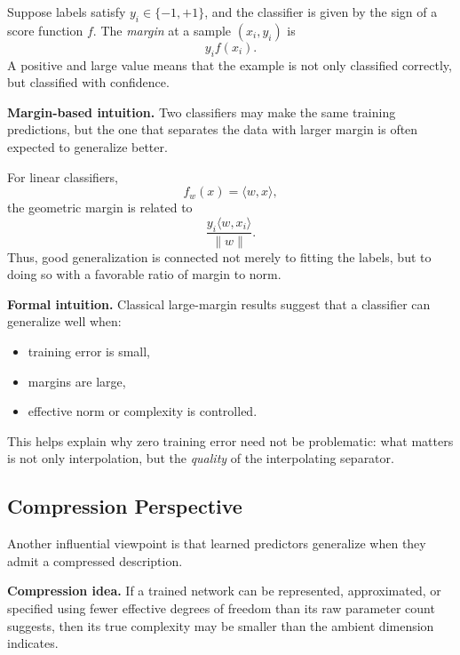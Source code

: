 Suppose labels satisfy \(y_i \in \{-1,+1\}\), and the classifier is given by the sign of a score function \(f\). The \emph{margin} at a sample \((x_i,y_i)\) is
\[
y_i f(x_i).
\]
A positive and large value means that the example is not only classified correctly, but classified with confidence.

\medskip

\noindent
\textbf{Margin-based intuition.}
Two classifiers may make the same training predictions, but the one that separates the data with larger margin is often expected to generalize better.

\medskip

\noindent
For linear classifiers,
\[
f_w(x)=\langle w,x\rangle,
\]
the geometric margin is related to
\[
\frac{y_i \langle w,x_i\rangle}{\|w\|}.
\]
Thus, good generalization is connected not merely to fitting the labels, but to doing so with a favorable ratio of margin to norm.

\medskip

\noindent
\textbf{Formal intuition.}
Classical large-margin results suggest that a classifier can generalize well when:
\begin{itemize}
    \item training error is small,
    \item margins are large,
    \item effective norm or complexity is controlled.
\end{itemize}

\medskip

\noindent
This helps explain why zero training error need not be problematic: what matters is not only interpolation, but the \emph{quality} of the interpolating separator.

\subsection{Compression Perspective}

Another influential viewpoint is that learned predictors generalize when they admit a compressed description.

\medskip

\noindent
\textbf{Compression idea.}
If a trained network can be represented, approximated, or specified using fewer effective degrees of freedom than its raw parameter count suggests, then its true complexity may be smaller than the ambient dimension indicates.

\medskip

